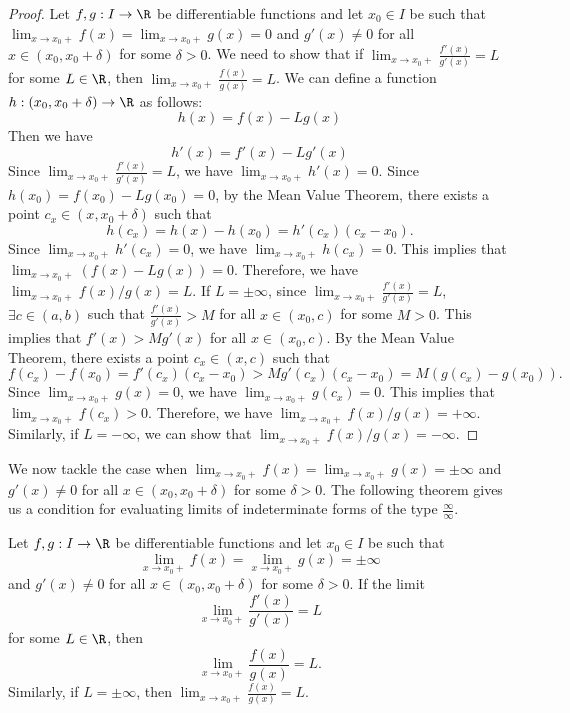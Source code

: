 \documentclass[openany]{book}
\begin{document}
\begin{proof}
    Let $f, g: I \to \R$ be differentiable functions and let $x_0 \in I$ be such that $\lim_{x \to x_0+} f(x) = \lim_{x \to x_0+} g(x) = 0$ and $g'(x) \neq 0$ for all $x \in (x_0, x_0 + \delta)$ for some $\delta > 0$. We need to show that if $\lim_{x \to x_0+} \frac{f'(x)}{g'(x)} = L$ for some $L \in \R$, then $\lim_{x \to x_0+} \frac{f(x)}{g(x)} = L$. We can define a function $h: (x_0, x_0 + \delta) \to \R$ as follows:
    \[
        h(x) = f(x) - L g(x)
    \]
    Then we have
    \[
        h'(x) = f'(x) - L g'(x)
    \]
    Since $\lim_{x \to x_0+} \frac{f'(x)}{g'(x)} = L$, we have $\lim_{x \to x_0+} h'(x) = 0$. Since $h(x_0) = f(x_0) - L g(x_0) = 0$, by the Mean Value Theorem, there exists a point $c_x \in (x, x_0 + \delta)$ such that
    \[
        h(c_x) = h(x) - h(x_0) = h'(c_x)(c_x - x_0).
    \]
    Since $\lim_{x \to x_0+} h'(c_x) = 0$, we have $\lim_{x \to x_0+} h(c_x) = 0$. This implies that $\lim_{x \to x_0+} (f(x) - L g(x)) = 0$. Therefore, we have $\lim_{x \to x_0+} f(x)/g(x) = L$.
    If $L = \pm \infty$, since $\lim_{x \to x_0+} \frac{f'(x)}{g'(x)} = L$, $\exists c \in (a, b)$ such that $\frac{f'(x)}{g'(x)} > M$ for all $x \in (x_0, c)$ for some $M > 0$. This implies that $f'(x) > M g'(x)$ for all $x \in (x_0, c)$. By the Mean Value Theorem, there exists a point $c_x \in (x, c)$ such that 
\[
    f(c_x) - f(x_0) = f'(c_x)(c_x - x_0) > M g'(c_x)(c_x - x_0) = M (g(c_x) - g(x_0)).
\]
Since $\lim_{x \to x_0+} g(x) = 0$, we have $\lim_{x \to x_0+} g(c_x) = 0$. This implies that $\lim_{x \to x_0+} f(c_x) > 0$. Therefore, we have $\lim_{x \to x_0+} f(x)/g(x) = +\infty$. Similarly, if $L = -\infty$, we can show that $\lim_{x \to x_0+} f(x)/g(x) = -\infty$.
\end{proof}
We now tackle the case when $\lim_{x \to x_0+} f(x) = \lim_{x \to x_0+} g(x) = \pm \infty$ and $g'(x) \neq 0$ for all $x \in (x_0, x_0 + \delta)$ for some $\delta > 0$. The following theorem gives us a condition for evaluating limits of indeterminate forms of the type $\frac{\infty}{\infty}$.
\begin{mytheorem}
    Let $f, g: I \to \R$ be differentiable functions and let $x_0 \in I$ be such that 
    \[ \lim_{x \to x_0+} f(x) = \lim_{x \to x_0+} g(x) = \pm \infty \]
    and $g'(x) \neq 0$ for all $x \in (x_0, x_0 + \delta)$ for some $\delta > 0$. If the limit
    \[
        \lim_{x \to x_0+} \frac{f'(x)}{g'(x)} = L
    \]
    for some $L \in \R$, then
    \[
        \lim_{x \to x_0+} \frac{f(x)}{g(x)} = L.
    \]
    Similarly, if $L = \pm \infty$, then $\lim_{x \to x_0+} \frac{f(x)}{g(x)} = L$.
\end{mytheorem}
\end{document}

